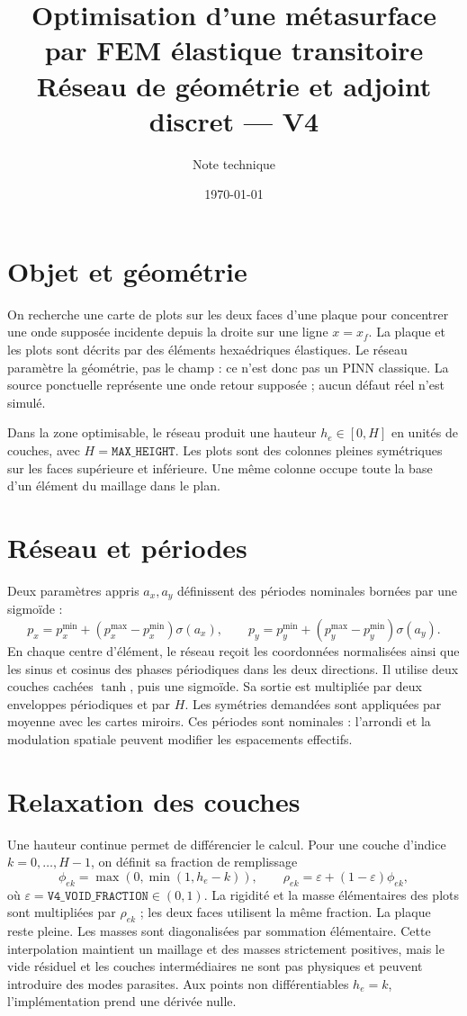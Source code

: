 \documentclass[11pt,a4paper]{article}
\title{Optimisation d'une métasurface par FEM élastique transitoire\\
\large Réseau de géométrie et adjoint discret --- V4}
\author{Note technique}
\date{\today}
\begin{document}
\maketitle
\tableofcontents

\section{Objet et géométrie}
On recherche une carte de plots sur les deux faces d'une plaque pour
concentrer une onde supposée incidente depuis la droite sur une ligne
\(x=x_f\). La plaque et les plots sont décrits par des éléments
hexaédriques élastiques. Le réseau paramètre la géométrie, pas le champ :
ce n'est donc pas un PINN classique. La source ponctuelle représente une
onde retour supposée ; aucun défaut réel n'est simulé.

Dans la zone optimisable, le réseau produit une hauteur \(h_e\in[0,H]\)
en unités de couches, avec \(H=\texttt{MAX\_HEIGHT}\). Les plots sont des
colonnes pleines symétriques sur les faces supérieure et inférieure.
Une même colonne occupe toute la base d'un élément du maillage dans le plan.

\section{Réseau et périodes}
Deux paramètres appris \(a_x,a_y\) définissent des périodes nominales bornées
par une sigmoïde :
\[
p_x=p_x^{\min}+(p_x^{\max}-p_x^{\min})\sigma(a_x),\qquad
p_y=p_y^{\min}+(p_y^{\max}-p_y^{\min})\sigma(a_y).
\]
En chaque centre d'élément, le réseau reçoit les coordonnées normalisées
ainsi que les sinus et cosinus des phases périodiques dans les deux
directions. Il utilise deux couches cachées \(\tanh\), puis une sigmoïde.
Sa sortie est multipliée par deux enveloppes périodiques et par \(H\).
Les symétries demandées sont appliquées par moyenne avec les cartes
miroirs. Ces périodes sont nominales : l'arrondi et la modulation spatiale
peuvent modifier les espacements effectifs.

\section{Relaxation des couches}
Une hauteur continue permet de différencier le calcul. Pour une couche
d'indice \(k=0,\ldots,H-1\), on définit sa fraction de remplissage
\[
\phi_{ek}=\max(0,\min(1,h_e-k)),\qquad
\rho_{ek}=\varepsilon+(1-\varepsilon)\phi_{ek},
\]
où \(\varepsilon=\texttt{V4\_VOID\_FRACTION}\in(0,1)\).
La rigidité et la masse élémentaires des plots sont multipliées par
\(\rho_{ek}\) ; les deux faces utilisent la même fraction. La plaque
reste pleine. Les masses sont diagonalisées par sommation élémentaire.
Cette interpolation maintient un maillage et des masses strictement
positives, mais le vide résiduel et les couches intermédiaires ne sont pas
physiques et peuvent introduire des modes parasites. Aux points
non différentiables \(h_e=k\), l'implémentation prend une dérivée nulle.
\end{document}
